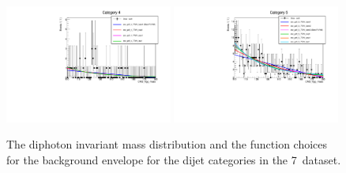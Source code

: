 \begin{figure}
  \includegraphics[width=0.49\textwidth]{ch5_anal_and_results/plots/mva_7TeV/multipdf_cat4.pdf}
  \includegraphics[width=0.49\textwidth]{ch5_anal_and_results/plots/mva_7TeV/multipdf_cat5.pdf}\\
  \caption{The diphoton invariant mass distribution and the function choices for the background envelope for the dijet categories in the 7~\TeV dataset. }
  \label{fig:multipdf2}
\end{figure}

